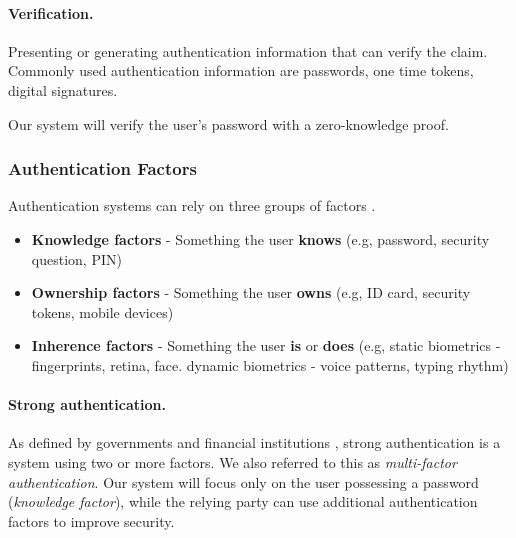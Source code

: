 \paragraph{Verification.} Presenting or generating authentication information that can verify the claim.
Commonly used authentication information are passwords, one time tokens, digital signatures.

Our system will verify the user's password with a zero-knowledge proof.

\subsubsection{Authentication Factors}

Authentication systems can rely on three groups of factors \cite{bignell2006authentication}.

\begin{itemize}
	\item \textbf{Knowledge factors} - Something the user \textbf{knows} (e.g, password, security question, PIN)
	\item \textbf{Ownership factors} - Something the user \textbf{owns} (e.g, ID card, security tokens, mobile devices)
	\item \textbf{Inherence factors} - Something the user \textbf{is} or \textbf{does} (e.g, static biometrics - fingerprints, retina, face. dynamic biometrics - voice patterns, typing rhythm)
\end{itemize}

\paragraph{Strong authentication.}
As defined by governments and financial institutions \cite{cnss2006national, ecb2013recommendations}, strong authentication is a system using two or more factors. 
We also referred to this as \textit{multi-factor authentication}. Our system will focus only on the user possessing a password (\textit{knowledge factor}), while the relying party can use additional authentication factors to improve security.

\newpage